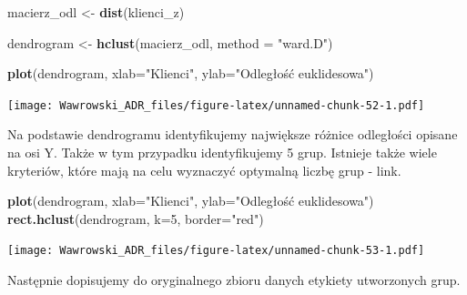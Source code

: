 \documentclass[]{book}
\newenvironment{Shaded}{\begin{snugshade}}{\end{snugshade}}
\newcommand{\DataTypeTok}[1]{\textcolor[rgb]{0.13,0.29,0.53}{#1}}
\newcommand{\DecValTok}[1]{\textcolor[rgb]{0.00,0.00,0.81}{#1}}
\newcommand{\KeywordTok}[1]{\textcolor[rgb]{0.13,0.29,0.53}{\textbf{#1}}}
\newcommand{\NormalTok}[1]{#1}
\newcommand{\OperatorTok}[1]{\textcolor[rgb]{0.81,0.36,0.00}{\textbf{#1}}}
\newcommand{\StringTok}[1]{\textcolor[rgb]{0.31,0.60,0.02}{#1}}
\begin{document}
\begin{Shaded}
\begin{Highlighting}[]
\NormalTok{macierz_odl <-}\StringTok{ }\KeywordTok{dist}\NormalTok{(klienci_z)}

\NormalTok{dendrogram <-}\StringTok{ }\KeywordTok{hclust}\NormalTok{(macierz_odl, }\DataTypeTok{method =} \StringTok{"ward.D"}\NormalTok{)}

\KeywordTok{plot}\NormalTok{(dendrogram, }\DataTypeTok{xlab=}\StringTok{"Klienci"}\NormalTok{, }\DataTypeTok{ylab=}\StringTok{"Odległość euklidesowa"}\NormalTok{)}
\end{Highlighting}
\end{Shaded}

\texttt{[image: Wawrowski\_ADR\_files/figure-latex/unnamed-chunk-52-1.pdf]}

Na podstawie dendrogramu identyfikujemy największe różnice odległości opisane na osi Y. Także w tym przypadku identyfikujemy 5 grup. Istnieje także wiele kryteriów, które mają na celu wyznaczyć optymalną liczbę grup - link.

\begin{Shaded}
\begin{Highlighting}[]
\KeywordTok{plot}\NormalTok{(dendrogram, }\DataTypeTok{xlab=}\StringTok{"Klienci"}\NormalTok{, }\DataTypeTok{ylab=}\StringTok{"Odległość euklidesowa"}\NormalTok{)}
\KeywordTok{rect.hclust}\NormalTok{(dendrogram, }\DataTypeTok{k=}\DecValTok{5}\NormalTok{, }\DataTypeTok{border=}\StringTok{"red"}\NormalTok{)}
\end{Highlighting}
\end{Shaded}

\texttt{[image: Wawrowski\_ADR\_files/figure-latex/unnamed-chunk-53-1.pdf]}

Następnie dopisujemy do oryginalnego zbioru danych etykiety utworzonych grup.

\begin{Shaded}
\end{Shaded}
\end{document}
